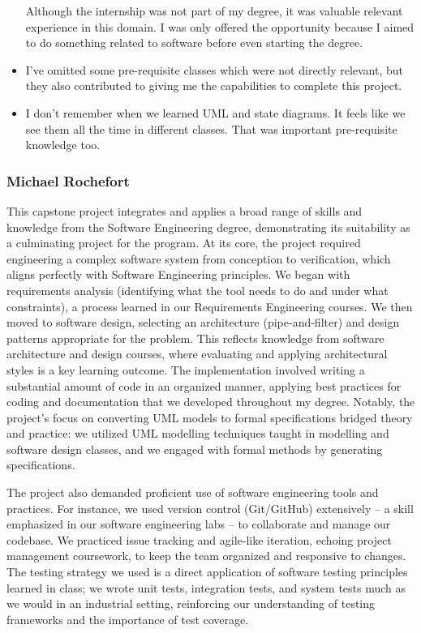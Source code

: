 \begin{itemize}
    Although the internship was not part of my degree, it was valuable relevant experience in this domain.
    I was only offered the opportunity because I aimed to do something related to software before even starting the degree.
    \item I've omitted some pre-requisite classes which were not directly relevant,
    but they also contributed to giving me the capabilities to complete this project.
    \item I don't remember when we learned UML and state diagrams.
    It feels like we see them all the time in different classes.
    That was important pre-requisite knowledge too.
\end{itemize}


\subsubsection{Michael Rochefort}

This capstone project integrates and applies a broad range of skills and knowledge from the Software Engineering degree, demonstrating its suitability as a culminating project for the program. At its core, the project required engineering a complex software system from conception to verification, which aligns perfectly with Software Engineering principles. We began with requirements analysis (identifying what the tool needs to do and under what constraints), a process learned in our Requirements Engineering courses. We then moved to software design, selecting an architecture (pipe-and-filter) and design patterns appropriate for the problem. This reflects knowledge from software architecture and design courses, where evaluating and applying architectural styles is a key learning outcome. The implementation involved writing a substantial amount of code in an organized manner, applying best practices for coding and documentation that we developed throughout my degree. Notably, the project’s focus on converting UML models to formal specifications bridged theory and practice: we utilized UML modelling techniques taught in modelling and software design classes, and we engaged with formal methods by generating specifications.

The project also demanded proficient use of software engineering tools and practices. For instance, we used version control (Git/GitHub) extensively – a skill emphasized in our software engineering labs – to collaborate and manage our codebase. We practiced issue tracking and agile-like iteration, echoing project management coursework, to keep the team organized and responsive to changes. The testing strategy we used is a direct application of software testing principles learned in class; we wrote unit tests, integration tests, and system tests much as we would in an industrial setting, reinforcing our understanding of testing frameworks and the importance of test coverage.

